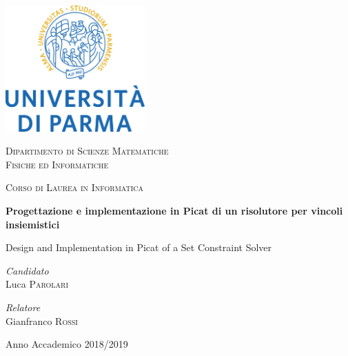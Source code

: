 \documentclass[12pt,a4paper,openright]{book}  %
\begin{document}
\begin{titlepage}
    \begin{center}
        \includegraphics[width=0.4\textwidth]{img/logo_unipr.png}

		\vspace{0.5cm}

		\Large
        \textsc{Dipartimento di Scienze Matematiche\\
        Fisiche ed Informatiche}

        \vspace{0.5cm}

        \Large
        \textsc{Corso di Laurea in Informatica}

		\vspace{1.1cm}

        \Huge
        \textbf{Progettazione e implementazione in Picat di un
          risolutore per vincoli insiemistici}

        \vspace{1cm}
        \LARGE
        Design and Implementation in Picat of a Set Constraint Solver

		\vspace{1.3cm}


		\begin{minipage}{0.4\textwidth}
			\begin{flushleft}
				\large
				\textit{Candidato}\\
				Luca \textsc{Parolari}
			\end{flushleft}
		\end{minipage}
		\begin{minipage}{0.4\textwidth}
			\begin{flushright}
				\large
				\textit{Relatore}\\
				Gianfranco \textsc{Rossi}
			\end{flushright}
		\end{minipage}

        \vfill

 		\large
        Anno Accademico 2018/2019

    \end{center}
\end{titlepage}
\end{document}
